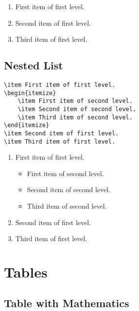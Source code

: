 \begin{enumerate}
    \item First item of first level.
    \item Second item of first level.
    \item Third item of first level.
\end{enumerate}

\subsection*{Nested List}%
\label{subsec:nested-list}

\begin{lstlisting}[caption={A nested list.}]
\item First item of first level.
\begin{itemize}
    \item First item of second level.
    \item Second item of second level.
    \item Third item of second level.
\end{itemize}
\item Second item of first level.
\item Third item of first level.
\end{lstlisting}

\begin{enumerate}
    \item First item of first level.
    \begin{itemize}
        \item First item of second level.
        \item Second item of second level.
        \item Third item of second level.
    \end{itemize}
    \item Second item of first level.
    \item Third item of first level.
\end{enumerate}

\section*{Tables}%
\label{sec:tables}

\subsection*{Table with Mathematics}%
\label{subsec:table-with-mathematics}


